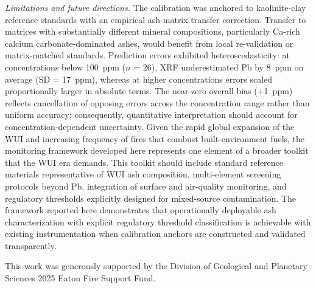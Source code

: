 \documentclass[
  journal=esthag,        %
  manuscript=article,    %
  layout=onecolumn       %
]{achemso}
\begin{document}
\textit{Limitations and future directions.}
The calibration was anchored to kaolinite-clay reference standards with an empirical ash-matrix transfer correction. Transfer to matrices with substantially different mineral compositions, particularly Ca-rich calcium carbonate-dominated ashes, would benefit from local re-validation or matrix-matched standards. Prediction errors exhibited heteroscedasticity: at concentrations below 100~ppm ($n$ = 26), XRF underestimated Pb by 8~ppm on average (SD = 17~ppm), whereas at higher concentrations errors scaled proportionally larger in absolute terms. The near-zero overall bias (+1~ppm) reflects cancellation of opposing errors across the concentration range rather than uniform accuracy; consequently, quantitative interpretation should account for concentration-dependent uncertainty. Given the rapid global expansion of the WUI\cite{radeloff2018wui} and increasing frequency of fires that combust built-environment fuels,\cite{nasem2022wuichemistry,schissel2025emissions} the monitoring framework developed here represents one element of a broader toolkit that the WUI era demands. This toolkit should include standard reference materials representative of WUI ash composition, multi-element screening protocols beyond Pb, integration of surface and air-quality monitoring, and regulatory thresholds explicitly designed for mixed-source contamination. The framework reported here demonstrates that operationally deployable ash characterization with explicit regulatory threshold classification is achievable with existing instrumentation when calibration anchors are constructed and validated transparently.


\begin{acknowledgement}
This work was generously supported by the Division of Geological and Planetary Sciences 2025 Eaton Fire Support Fund.
\end{acknowledgement}



\end{document}
